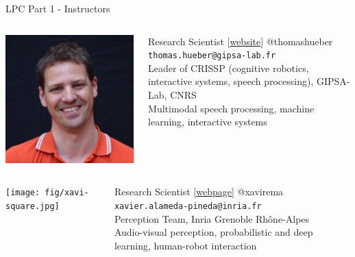 \documentclass{beamer}
\begin{document}
\begin{frame}{LPC Part 1 - Instructors}
 \begin{columns}
  \begin{column}{0.25\textwidth}
  \includegraphics[width=\textwidth]{fig/hueber.jpg} 
  \end{column}
  \begin{column}{0.7\textwidth}
   Research Scientist [\alert{\href{http://www.gipsa-lab.fr/~thomas.hueber}{website}}] @thomashueber\\
   \texttt{thomas.hueber@gipsa-lab.fr}\\
    Leader of CRISSP (cognitive robotics, interactive systems, speech processing), GIPSA-Lab, CNRS\vspace{5mm}\\
    Multimodal speech processing, machine learning, interactive systems
  \end{column}
 \end{columns}\vspace{5mm}
 \begin{columns}
  \begin{column}{0.25\textwidth}
  \texttt{[image: fig/xavi-square.jpg]} 
  \end{column}
  \begin{column}{0.7\textwidth}
   Research Scientist [\href{http://xavirema.eu}{\alert{webpage}}] @xavirema\\
   \texttt{xavier.alameda-pineda@inria.fr}\\
   Perception Team, Inria Grenoble Rh\^one-Alpes\vspace{5mm}\\
   Audio-visual perception, probabilistic and deep learning, human-robot interaction
  \end{column}
 \end{columns}
\end{frame}
\end{document}
